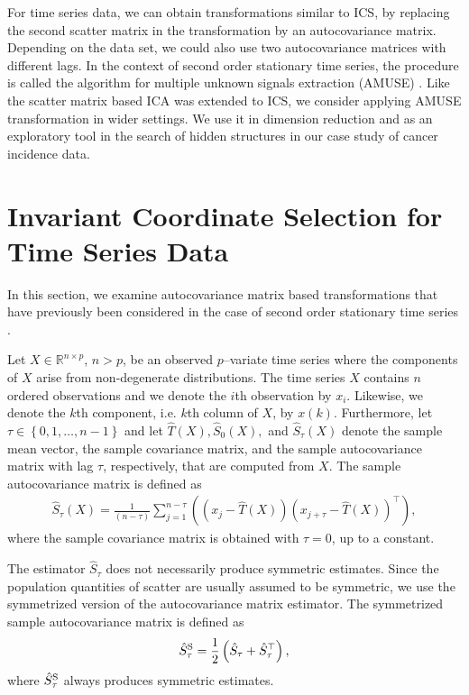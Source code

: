 \documentclass{llncs}
\begin{document}
For time series data, we can obtain transformations similar to ICS, by replacing the second scatter matrix in the transformation by an  autocovariance matrix.  Depending on the data set, we could also use two autocovariance matrices with different lags.  In the context of second order stationary time series, the procedure is called the algorithm for multiple unknown signals extraction (AMUSE) \cite{Tong1990}. Like the
scatter matrix based ICA was extended to ICS, we consider applying
AMUSE transformation in  wider settings.
We use it in dimension reduction and as an exploratory
tool in the search of hidden structures in our case study of cancer incidence data. 

\section{Invariant Coordinate Selection for Time Series Data}\label{tics}
In this section, we examine autocovariance matrix based transformations that have previously been considered in the case of second order stationary time series \cite{Miettinen2012,Tong1990}.

Let $X\in \mathbb{R}^{n\times p}$, $n>p$, be an observed  $p$--variate time series where the components of $X$ arise from non-degenerate distributions. The time series $X$ contains $n$ ordered observations and we denote the $i$th observation by $x_i$. Likewise, we denote the $k$th component, i.e. $k$th column of $X$, by $x\left(k\right)$.  Furthermore, let $\tau \in \left\{0,1,\ldots,n-1\right\}$ and let $\hat{T}\left(X\right), \hat{S}_0\left(X\right),$ and $\hat{S}_{\tau}\left(X\right)$ denote the sample mean vector, the sample covariance matrix, and the sample autocovariance matrix with lag $\tau$, respectively, that are computed from  $X.$ The sample autocovariance matrix is defined as 
\begin{align*}
\hat{S}_{\tau}\left(X\right)=\frac{1}{\left(n -\tau\right)} \sum^{n-\tau}_{j=1}\left(\left(x_j - \hat{T}\left(X\right)\right)\left(x_{j+\tau} - \hat{T}\left(X\right)\right)^\top \right),
\end{align*}
where the sample covariance matrix is obtained with $\tau=0$, up to a constant. 

The estimator $\hat{S}_\tau$ does not necessarily produce symmetric estimates. Since the population quantities of scatter are usually assumed to be symmetric, we use the symmetrized version of the autocovariance matrix estimator. The symmetrized sample autocovariance matrix is defined as
\begin{align*}
\hat{S}_\tau^\textnormal{S} = \frac{1}{2} \left( \hat{S}_\tau + \hat{S}^\top_\tau \right),
\end{align*}
where $\hat{S}_\tau^\textnormal{S}$ always produces symmetric estimates.
\end{document}
